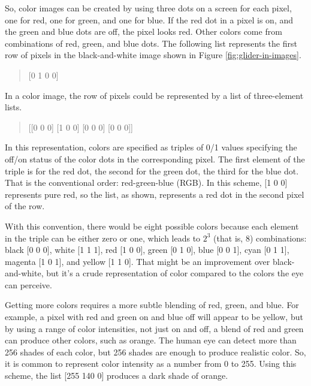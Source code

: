 So, color images can be created by using three dots on a screen
for each pixel, 
one for red, one for green, and one for blue.
If the red dot in a pixel is on, and the green and blue dots
are off, the pixel looks red. Other colors come from combinations
of red, green, and blue dots.
The following list represents the first row of pixels
in the black-and-white image shown in
Figure \ref{fig:glider-in-images}.
\begin{quote}
    \textsf{[0 1 0 0]}
\end{quote}
In a color image, the row of pixels could be represented by 
a list of three-element lists.
\begin{quote}
    \textsf{[[0 0 0] [1 0 0] [0 0 0] [0 0 0]]}
\end{quote}
In this representation, colors are specified as triples of 0/1 values
specifying the off/on status of the color dots in the corresponding pixel.
The first element of the triple is for the red dot, the second
for the green dot, the third for the blue dot. 
That is the conventional order: 
red-green-blue (RGB).
In this scheme, \textsf{[1 0 0]} represents pure red, 
so the list, as shown, represents a red dot in the second pixel of the row.

With this convention, there would be eight possible colors because
each element in the triple can be either zero or one,
which leads to $2^3$ (that is, $8$) combinations:
black \textsf{[0 0 0]}, 
white \textsf{[1 1 1]}, 
red \textsf{[1 0 0]},
green \textsf{[0 1 0]}, 
blue \textsf{[0 0 1]},
cyan \textsf{[0 1 1]},
magenta \textsf{[1 0 1]},
and
yellow \textsf{[1 1 0]}.
That might be an improvement over black-and-white, 
but it's a crude representation of color
compared to the colors the eye can perceive.

Getting more colors requires a more subtle blending of
red, green, and blue. For example, a pixel with red and green
on and blue off will appear to be yellow,
but by using a range of color intensities,
not just on and off, a blend of red and green can produce other 
colors, such as orange. The human eye can detect more than 256 shades of
each color, but 256 shades are enough to produce realistic color. 
So, it is common to represent color intensity as a number
from 0 to 255. Using this scheme, the list \textsf{[255 140 0]} produces 
a dark shade of orange.

